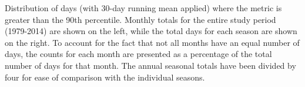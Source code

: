 \label{fig:annual_distribution}
Distribution of days (with 30-day running mean applied) where the metric is greater than the 90th percentile. Monthly totals for the entire study period (1979-2014) are shown on the left, while the total days for each season are shown on the right. To account for the fact that not all months have an equal number of days, the counts for each month are presented as a percentage of the total number of days for that month. The annual seasonal totals have been divided by four for ease of comparison with the individual seasons.   